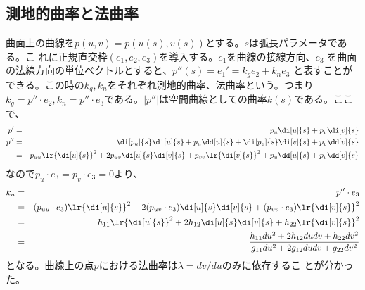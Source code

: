         \subsection{測地的曲率と法曲率}
            曲面上の曲線を$p(u,v)=p(u(s),v(s))$とする。$s$は弧長パラメータである。こ
            れに正規直交枠$(e_1,e_2,e_3)$を導入する。$e_1$を曲線の接線方向、$e_3$
            を曲面の法線方向の単位ベクトルとすると、$p''(s) = e_1' = k_ge_2+k_ne_3$
            と表すことができる。この時の$k_g,k_n$をそれぞれ測地的曲率、法曲率という。つまり
            $k_g=p''\cdot e_2,k_n=p''\cdot e_3$である。$|p''|$は空間曲線としての曲率$k(s)$である。ここで、
            \begin{eqnarray*}
                p' &=& p_u\di[u]{s}+p_v\di[v]{s}\\
                p'' &=& \di[p_u]{s}\di[u]{s}+p_u\dd[u]{s}
                + \di[p_v]{s}\di[v]{s}+p_v\dd[v]{s}\\
                &=& p_{uu}\lr{\di[u]{s}}^2 + 2p_{uv}\di[u]{s}\di[v]{s} + p_{vv}\lr{\di[v]{s}}^2
                + p_u\dd[u]{s} + p_v\dd[v]{s}\\
            \end{eqnarray*}
            なので$p_u\cdot e_3=p_v\cdot e_3=0$より、
            \begin{eqnarray*}
                k_n &=& p''\cdot e_3\\
                &=& (p_{uu}\cdot e_3)\lr{\di[u]{s}}^2
                + 2(p_{uv}\cdot e_3)\di[u]{s}\di[v]{s}
                + (p_{vv}\cdot e_3)\lr{\di[v]{s}}^2\\
                &=& h_{11}\lr{\di[u]{s}}^2+2h_{12}\di[u]{s}\di[v]{s}+h_{22}\lr{\di[v]{s}}^2\\
                &=&\frac{h_{11}du^2+2h_{12}dudv+h_{22}dv^2}
                {g_{11}du^2+2g_{12}dudv+g_{22}dv^2}\\
            \end{eqnarray*}
            となる。曲線上の点$p$における法曲率は$\lambda = dv/du$のみに依存するこ
            とが分かった。


